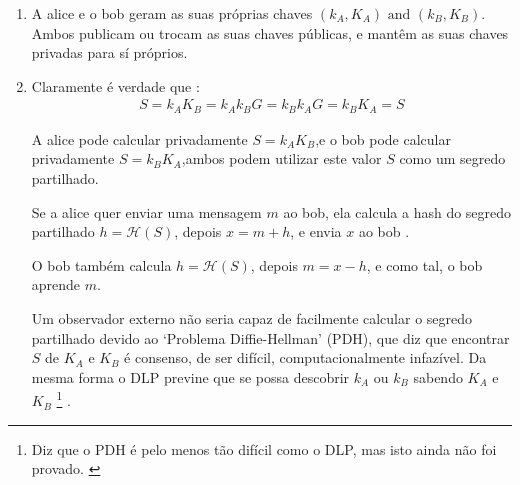 \begin{enumerate}

	\item A alice e o bob geram as suas próprias chaves \((k_A, K_A) \textrm{ and } (k_B, K_B)\). Ambos publicam ou trocam as suas chaves públicas, e mantêm as suas chaves privadas para sí próprios.
    \item Claramente é verdade que : 
\vspace{.375cm}
\begin{align*}
S = k_A K_B = k_A k_B G = k_B k_A G = k_B K_A = S
\end{align*}


    A alice pode calcular privadamente \(S = k_A K_B\),\newline e o bob pode calcular privadamente \(S = k_B K_A\),\newline ambos podem utilizar este valor \(S\) como um segredo partilhado. 


Se a alice quer enviar uma mensagem $m$ ao bob,
\newline ela calcula a hash do segredo partilhado $h = \mathcal{H}(S)$,
\newline depois $x = m + h$, e envia $x$ ao bob .

O bob também calcula $h = \mathcal{H}(S)$,
\newline depois $m = x - h$, e como tal, o bob aprende $m$.    


Um observador externo não seria capaz de facilmente calcular o segredo partilhado devido ao `Problema Diffie-Hellman' (PDH), que diz que encontrar $S$ de $K_A$ e $K_B$ é consenso, de ser difícil, computacionalmente infazível. Da mesma forma o DLP previne que se possa descobrir $k_A$ ou $k_B$ sabendo $K_A$ e $K_B$ \footnote{Diz que o PDH é pelo menos tão difícil como o DLP, mas isto ainda não foi provado. \cite{diffie-hellman-problem}}
.


\end{enumerate}

